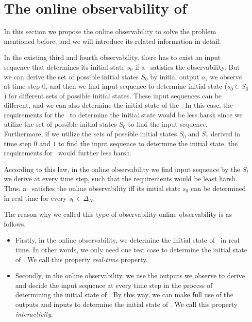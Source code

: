 \section{The online observability of \BCNs}
\label{sec:online}
In this section we propose the online observability to solve the problem mentioned before, and we will introduce its related information in detail. 

In the existing third and fourth observability, there has to exist an input sequence that determines its initial state $s_0$ if a \BCN\ satisfies the observability. 
But we can derive the set of possible initial states $S_0$ by initial output $o_1$ we observe at time step $0$, and then we find input sequence to determine initial state ($s_0\in S_0$) for different sets of possible initial states. These input sequences can be different, and we can also determine the initial state of the \BCN.
In this case, the requirements for the \BCN\ to determine the initial state would be less harsh since we utilize the set of possible initial states $S_0$ to find the input sequence. Furthermore, if we utilize the sets of possible initial states $S_0$ and $S_1$ derived in time step $0$ and $1$ to find the input sequence to determine the initial state, the requirements for \BCNs\ would further less harsh. 

According to this law, in the online observability we find input sequence by the $S_t$ we derive at every time step, such that the requirements would be least harsh. Thus, a \BCN\ satisfies the online observability iff its initial state $s_0$ can be determined in real time for every $s_0 \in \Delta_N$.


The reason why we called this type of observability online observability is as follows.
\begin{itemize}
  \item Firstly, in the online observability, we determine the initial state of \BCNs\ in real time. In other words, we only need one test case to determine the initial state of \BCNs. We call this property {\em real-time} property.%
  \item  Secondly, in the online observability, we use the outputs we observe to derive and decide the input sequence at every time step in the process of determining the initial state of \BCNs. By this way, we can make full use of the outputs and inputs to determine the initial state of \BCNs. We call this property {\em interactivity}.
\end{itemize} 

